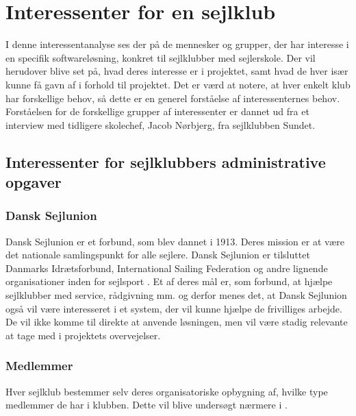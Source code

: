 \chapter{Interessenter for en sejlklub}\label{chap:interessent-analyse-ved-sejlklubber}

I denne interessentanalyse ses der på de mennesker og grupper, der har interesse i en specifik softwareløsning, konkret til sejlklubber med sejlerskole.
Der vil herudover blive set på, hvad deres interesse er i projektet, samt hvad de hver især kunne få gavn af i forhold til projektet.
Det er værd at notere, at hver enkelt klub har forskellige behov, så dette er en generel forståelse af interessenternes behov.
Forståelsen for de forskellige grupper af interessenter er dannet ud fra et interview med tidligere skolechef, Jacob Nørbjerg, fra sejlklubben Sundet.


\section{Interessenter for sejlklubbers administrative opgaver}


\subsection{Dansk Sejlunion}

Dansk Sejlunion er et forbund, som blev dannet i 1913. Deres mission er at være det nationale samlingspunkt for alle sejlere. 
Dansk Sejlunion er tilsluttet Danmarks Idrætsforbund, International Sailing Federation og andre lignende organisationer inden for sejlsport \citep{Sejlsportdk}.
Et af deres mål er, som forbund, at hjælpe sejlklubber med service, rådgivning mm. og derfor menes det, at Dansk Sejlunion også vil være interesseret i et system, der vil kunne hjælpe de frivilliges arbejde. 
De vil ikke komme til direkte at anvende løsningen, men vil være stadig relevante at tage med i projektets overvejelser. 


\subsection{Medlemmer}\label{subsec:interessent-medlemmer}

Hver sejlklub bestemmer selv deres organisatoriske opbygning af, hvilke type medlemmer de har i klubben.
Dette vil blive undersøgt nærmere i . 

